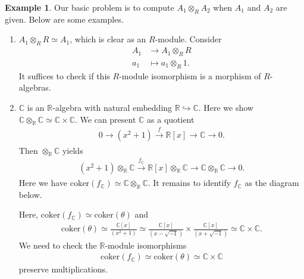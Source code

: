 \documentclass[12pt]{report}
\theoremstyle{plain}
\theoremstyle{remark}
\theoremstyle{definition}
\newtheorem{example}[theorem]{Example}
\newcommand{\R}{\mathbb{R}}
\newcommand{\C}{\mathbb{C}}
\begin{document}
\begin{example}
    Our basic problem is to compute $A_1\otimes_R A_2$ when $A_1$ and $A_2$ are given. Below are some examples.
    \begin{enumerate}
        \item $A_1\otimes_R R\simeq A_1$, which is clear as an $R$-module. Consider
        \begin{align*}
            A_1 &\to A_1 \otimes_R R \\
            a_1 &\mapsto a_1\otimes_R 1.
        \end{align*}
        It suffices to check if this $R$-module isomorphism is a morphism of $R$-algebras.
        \item $\C$ is an $\R$-algebra with natural embedding $\R\hookrightarrow\C$. Here we show $\C\otimes_\R \C\simeq \C\times\C$. We can present $\C$ as a quotient
        \begin{align*}
            0\to (x^2+1) \xrightarrow[]{f} \R[x] \to \C\to 0.
        \end{align*}
        Then $\otimes_\R \C$ yields
        \begin{align*}
            (x^2+1)\otimes_\R \C \xrightarrow[]{f_\C} \R[x]\otimes_\R \C \to \C\otimes_\R \C\to 0.
        \end{align*}
        Here we have $\mathrm{coker}(f_\C)\simeq \C\otimes_\R \C$. It remains to identify $f_\C$ as the diagram below.
        \begin{figure}[H]
            \centering
        \end{figure}
        \noindent Here, $\mathrm{coker}(f_\C)\simeq \mathrm{coker}(\theta)$ and 
        \begin{align*}
            \mathrm{coker}(\theta) \simeq \frac{\C[x]}{(x^2+1)}\simeq \frac{\C[x]}{(x-\sqrt{-1})}\times \frac{\C[x]}{(x+\sqrt{-1})} \simeq \C\times \C.
        \end{align*}
        We need to check the $\R$-module isomorphisms
        \begin{align*}
            \mathrm{coker}(f_\C)\simeq \mathrm{coker}(\theta)\simeq \C\times\C
        \end{align*}
        preserve multiplications.
    \end{enumerate}
\end{example}
\end{document}
